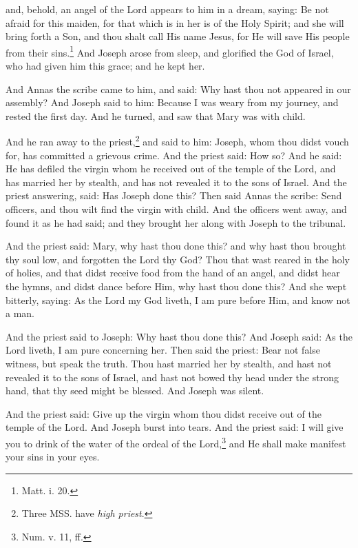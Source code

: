 \pend\pstart
and, behold, an angel of the Lord appears to him in a dream, saying: Be not afraid for this maiden, for that which is in her is of the Holy Spirit; and she will bring forth a Son, and thou shalt call His name Jesus, for He will save His people from their sins.\footnote{Matt. i. 20.} And Joseph arose from sleep, and glorified the God of Israel, who had given him this grace; and he kept her.

\pend\pstart
{}

\pend\setcounter{pstartR}{1}\pstart
And Annas the scribe came to him, and said: Why hast thou not appeared in our assembly? And Joseph said to him: Because I was weary from my journey, and rested the first day. And he turned, and saw that Mary was with child.

\pend\pstart
And he ran away to the priest,\footnote{Three MSS. have \textit{high priest}.} and said to him: Joseph, whom thou didst vouch for, has committed a grievous crime. And the priest said: How so? And he said: He has defiled the virgin whom he received out of the temple of the Lord, and has married her by stealth, and has not revealed it to the sons of Israel. And the priest answering, said: Has Joseph done this? Then said Annas the scribe: Send officers, and thou wilt find the virgin with child. And the officers went away, and found it as he had said; and they brought her along with Joseph to the tribunal.

\pend\pstart
And the priest said: Mary, why hast thou done this? and why hast thou brought thy soul low, and forgotten the Lord thy God? Thou that wast reared in the holy of holies, and that didst receive food from the hand of an angel, and didst hear the hymns, and didst dance before Him, why hast thou done this? And she wept bitterly, saying: As the Lord my God liveth, I am pure before Him, and know not a man.

\pend\pstart
And the priest said to Joseph: Why hast thou done this? And Joseph said: As the Lord liveth, I am pure concerning her. Then said the priest: Bear not false witness, but speak the truth. Thou hast married her by stealth, and hast not revealed it to the sons of Israel, and hast not bowed thy head under the strong hand, that thy seed might be blessed. And Joseph was silent.

\pend\pstart
{}

\pend\setcounter{pstartR}{1}\pstart
And the priest said: Give up the virgin whom thou didst receive out of the temple of the Lord. And Joseph burst into tears. And the priest said: I will give you to drink of the water of the ordeal of the Lord,\footnote{Num. v. 11, ff.} and He shall make manifest your sins in your eyes.

